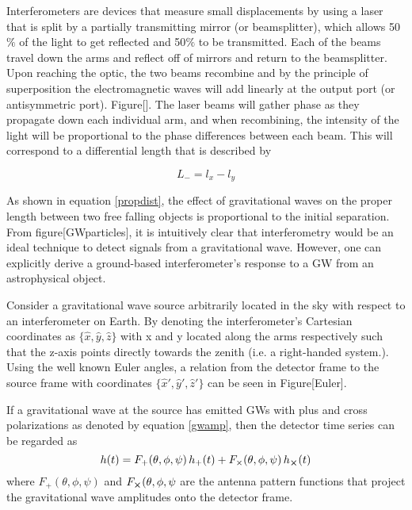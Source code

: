 	Interferometers are devices that measure small displacements by using a laser that is split by a partially transmitting mirror (or beamsplitter), which allows 50$\%$ of the light to get reflected and 50$\%$ to be transmitted.  Each of the beams travel down the arms and reflect off of mirrors and return to the beamsplitter.  Upon reaching the optic, the two beams recombine and by the principle of superposition  the electromagnetic waves will add linearly at the output port (or antisymmetric port). Figure[].  The laser beams will gather phase as they propagate down each individual arm, and when recombining, the intensity of the light will be proportional to the phase differences between each beam.  This will correspond to a differential length that is described by
	
	\begin{equation}
	L_{-} = l_{x} - l_{y}
	\end{equation}
	
	As shown in equation \ref{propdist}, the effect of gravitational waves on the proper length between two free falling objects is proportional to the initial separation.  From figure[GWparticles], it is intuitively clear that interferometry would be an ideal technique to detect signals from a gravitational wave.  However, one can explicitly derive a ground-based interferometer's response to a GW from an astrophysical object.
	
	Consider a gravitational wave source arbitrarily located in the sky with respect to an interferometer on Earth. By denoting the interferometer's Cartesian coordinates as $\{\hat{x},\hat{y},\hat{z}\}$ with x and y located along the arms respectively such that the z-axis points directly towards the zenith (i.e. a right-handed system.).  Using the well known Euler angles, a relation from the detector frame to the source frame with coordinates $\{\hat{x}',\hat{y}',\hat{z}'\}$ can be seen in Figure[Euler]. 
	
	If a gravitational wave at the source has emitted GWs with plus and cross polarizations as denoted by equation \ref{gwamp}, then the detector time series can be regarded as \cite{S6sensitivity} \cite{Finn:1995}
	\begin{equation}
	h(t) = F_{+}(\theta,\phi,\psi) \, h_{+}(t) + F_{\times}(\theta,\phi,\psi) \, h_{\cross}(t)
	\end{equation}
	where $F_{+}(\theta,\phi,\psi)$ and $F_{\cross}(\theta,\phi,\psi$ are the antenna pattern functions that project the gravitational wave amplitudes onto the detector frame.
	
